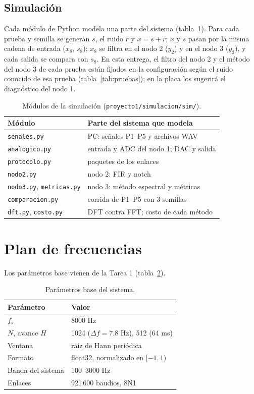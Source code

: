 \documentclass[10pt,a4paper,twocolumn]{article}
\newcommand{\ruta}[1]{\nolinkurl{#1}}
\begin{document}
\subsection{Simulación}
Cada módulo de Python modela una parte del sistema (tabla~\ref{tab:modulos}). Para cada prueba y semilla se generan $s$, el ruido $r$ y $x = s + r$; $x$ y $s$ pasan por la misma cadena de entrada ($x_8$, $s_8$); $x_8$ se filtra en el nodo 2 ($y_2$) y en el nodo 3 ($y_3$), y cada salida se compara con $s_8$. En esta entrega, el filtro del nodo 2 y el método del nodo 3 de cada prueba están fijados en la configuración según el ruido conocido de esa prueba (tabla~\ref{tab:pruebas}); en la placa los sugerirá el diagnóstico del nodo 1.
\begin{table}[!t]\centering\caption{Módulos de la simulación (\ruta{proyecto1/simulacion/sim/}).}\label{tab:modulos}\footnotesize\setlength{\tabcolsep}{4pt}
\begin{tabular}{>{\raggedright}p{}p{}}\toprule Módulo & Parte del sistema que modela\\\midrule
\ruta{senales.py} & PC: señales P1--P5 y archivos WAV\\
\ruta{analogico.py} & entrada y ADC del nodo 1; DAC y salida\\
\ruta{protocolo.py} & paquetes de los enlaces\\
\ruta{nodo2.py} & nodo 2: FIR y notch\\
\ruta{nodo3.py}, \ruta{metricas.py} & nodo 3: método espectral y métricas\\
\ruta{comparacion.py} & corrida de P1--P5 con 3 semillas\\
\ruta{dft.py}, \ruta{costo.py} & DFT contra FFT; costo de cada método\\\bottomrule\end{tabular}\end{table}

\section{Plan de frecuencias}\label{sec:plan}
Los parámetros base vienen de la Tarea 1\cite{tarea1} (tabla~\ref{tab:parametros}).
\begin{table}[!t]\centering\caption{Parámetros base del sistema.}\label{tab:parametros}\small
\begin{tabular}{ll}\toprule Parámetro & Valor\\\midrule
$f_s$ & 8000 Hz\\
$N$, avance $H$ & 1024 ($\Delta f = 7.8$ Hz), 512 (64 ms)\\
Ventana & raíz de Hann periódica\\
Formato & float32, normalizado en $[-1,1)$\\
Banda del sistema & 100--3000 Hz\\
Enlaces & 921\,600 baudios, 8N1\\\bottomrule\end{tabular}\end{table}
\end{document}
